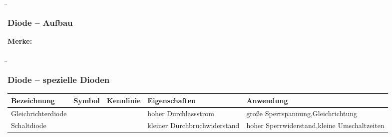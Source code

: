 \begin{frame}
    \b{\frametitle{Diode -- Aufbau}
        \textbf{Merke:}
        \begin{itemize}
        \end{itemize}
        }
\end{frame}

\begin{frame}
    \b{
        \frametitle{Diode -- spezielle Dioden}
        \begin{table}[H]
            \centering 
            \begin{tabular}{ |p{2.1cm}|p{1.4cm}|p{3.2cm}|p{2.8cm}|p{3cm}| }
                \hline
                \textbf{Bezeichnung} & \textbf{Symbol} & \textbf{Kennlinie} & \textbf{Eigenschaften} & \textbf{Anwendung} \\
                \hline
                Gleich\-richter\-diode  
                &
                \begin{minipage}[t][2.6cm][c]{1.4cm}
                    \centering 
                \end{minipage}
                & 
                \begin{minipage}[t][2.6cm][c]{3.3cm}
                    \centering 
                \end{minipage}
                & 
                hoher Durchlassstrom &
                 große Sperrspannung,\newline Gleichrichtung\\
                \hline
                Schalt\-diode 
                &
                \begin{minipage}[t][2.6cm][c]{1.4cm}
                    \centering 
                \end{minipage}
                & 
                \begin{minipage}[t][2.6cm][c]{3.3cm}
                    \centering 
                \end{minipage}
                & 
                kleiner Durchbruchwiderstand &
                hoher Sperrwiderstand,\newline kleine Umschaltzeiten\\
                \hline
            \end{tabular}
        \end{table}
    }

\end{frame}

